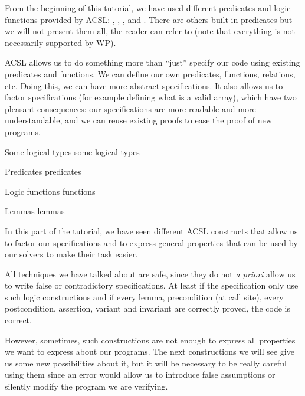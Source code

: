 From the beginning of this tutorial, we have used different predicates
and logic functions provided by ACSL: ,
, ,
 and . There are others
built-in predicates but we will not present them all, the reader can refer to
(note that everything is not necessarily supported by WP).



ACSL allows us to do something more than ``just'' specify our code using
existing predicates and functions. We can define our own predicates,
functions, relations, etc. Doing this, we can have more abstract
specifications. It also allows us to factor specifications (for example
defining what is a valid array), which have two pleasant consequences:
our specifications are more readable and more understandable, and we can
reuse existing proofs to ease the proof of new programs.



\begin{levelTwo}
  {Some logical types}
  {some-logical-types}
\end{levelTwo}

\begin{levelTwo}
  {Predicates}
  {predicates}
\end{levelTwo}

\begin{levelTwo}
  {Logic functions}
  {functions}
\end{levelTwo}

\begin{levelTwo}
  {Lemmas}
  {lemmas}
\end{levelTwo}

\horizontalLine
\newpage

In this part of the tutorial, we have seen different ACSL constructs that
allow us to factor our specifications and to express general properties
that can be used by our solvers to make their task easier.




All techniques we have talked about are safe, since they do not \emph{a
priori} allow us to write false or contradictory specifications. At
least if the specification only use such logic constructions and if
every lemma, precondition (at call site), every postcondition,
assertion, variant and invariant are correctly proved, the code is
correct.




However, sometimes, such constructions are not enough to express all
properties we want to express about our programs. The next constructions
we will see give us some new possibilities about it, but it will be
necessary to be really careful using them since an error would allow us
to introduce false assumptions or silently modify the program we are
verifying.
